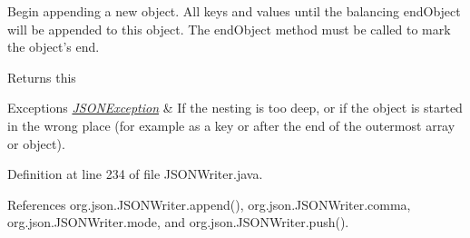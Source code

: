 Begin appending a new object. All keys and values until the balancing {\ttfamily end\-Object} will be appended to this object. The {\ttfamily end\-Object} method must be called to mark the object's end. \begin{DoxyReturn}{Returns}
this 
\end{DoxyReturn}

\begin{DoxyExceptions}{Exceptions}
{\em \hyperlink{classorg_1_1json_1_1_j_s_o_n_exception}{J\-S\-O\-N\-Exception}} & If the nesting is too deep, or if the object is started in the wrong place (for example as a key or after the end of the outermost array or object). \\
\hline
\end{DoxyExceptions}


Definition at line 234 of file J\-S\-O\-N\-Writer.\-java.



References org.\-json.\-J\-S\-O\-N\-Writer.\-append(), org.\-json.\-J\-S\-O\-N\-Writer.\-comma, org.\-json.\-J\-S\-O\-N\-Writer.\-mode, and org.\-json.\-J\-S\-O\-N\-Writer.\-push().


